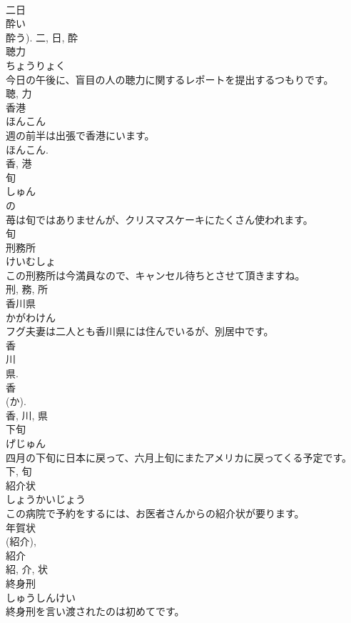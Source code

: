 \documentclass[8pt]{extreport}
\begin{document}
\begin{CJK}{UTF8}{min}
\\	二日 
\\	酔い 
\\	酔う).	二, 日, 酔	
\\	聴力	
\\	ちょうりょく	
\\	今日の午後に、盲目の人の聴力に関するレポートを提出するつもりです。	
\\	聴, 力	
\\	香港	
\\	ほんこん	
\\	週の前半は出張で香港にいます。	
\\	ほんこん. 
\\	香, 港	
\\	旬	
\\	しゅん	
\\	の 
\\	苺は旬ではありませんが、クリスマスケーキにたくさん使われます。	
\\	旬	
\\	刑務所	
\\	けいむしょ	
\\	この刑務所は今満員なので、キャンセル待ちとさせて頂きますね。	
\\	刑, 務, 所	
\\	香川県	
\\	かがわけん	
\\	フグ夫妻は二人とも香川県には住んでいるが、別居中です。	
\\	香 
\\	川 
\\	県. 
\\	香 
\\	(か). 
\\	香, 川, 県	
\\	下旬	
\\	げじゅん	
\\	四月の下旬に日本に戻って、六月上旬にまたアメリカに戻ってくる予定です。	
\\	下, 旬	
\\	紹介状	
\\	しょうかいじょう	
\\	この病院で予約をするには、お医者さんからの紹介状が要ります。	
\\	年賀状 
\\	(紹介), 
\\	紹介 
\\	紹, 介, 状	
\\	終身刑	
\\	しゅうしんけい	
\\	終身刑を言い渡されたのは初めてです。	

\end{CJK}
\end{document}
